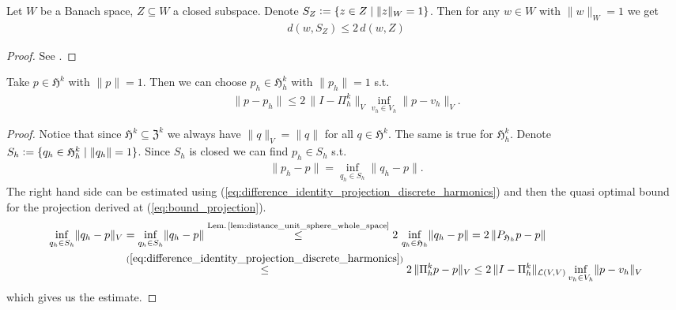 \documentclass[../master_thesis.tex]{subfiles}
\begin{document}
\begin{lemma}\label{lem:distance_unit_sphere_whole_space}
    Let $W$ be a Banach space, $Z \subseteq W$ a closed subspace. Denote 
    $S_Z \vcentcolon= \{ z \in Z \mid \lVert z \rVert _W = 1 \}$. Then for 
    any $w \in W$ with $\lVert w \rVert _W = 1$ we get 
    \begin{align*}
        d(w,S_Z) \leq 2 \,d(w,Z)
    \end{align*}  
\end{lemma}
\begin{proof}
    See \cite[Ch.4 §2, (2.13)]{kato_perturbation_theory}.
\end{proof}

\begin{proposition}\label{prop:choice_of_discrete_harmonic_form}
    Take $p \in \mathfrak{H}^k$ with $\lVert p \rVert = 1$. Then we can 
    choose $p_h \in \mathfrak{H}_h^k$ with $\lVert p_h \rVert = 1$ s.t. 
    \begin{align*}
        \lVert p - p_h \rVert
        \leq 2\,\lVert I - \Pi_h^k\rVert _V \inf_{v_h \in V_h} \lVert p - v_h \rVert _V.
    \end{align*}
\end{proposition}
\begin{proof}
    Notice that since $\mathfrak{H}^k \subseteq \mathfrak{Z}^k$ we always have
    $\lVert q \rVert _V = \lVert q \rVert$ for all $q \in \mathfrak{H}^k$. The same is 
    true for $\mathfrak{H}^k_h$.
    Denote $S_h \vcentcolon= \{ q_h \in \mathfrak{H}^k_h \mid \lVert q_h \rVert = 1 \}$.
    Since $S_h$ is closed we can find $p_h \in S_h$ s.t. 
    \begin{align*}
        \lVert p_h - p \rVert = \inf_{q_h \in S_h} \lVert q_h - p \rVert.
    \end{align*}
    The right hand side can be estimated using (\ref{eq:difference_identity_projection_discrete_harmonics}) 
    and then the 
    quasi optimal bound for the projection derived at (\ref{eq:bound_projection}).
    \begin{align*}
        \inf_{q_h \in S_h} \lVert q_h - p \rVert _V 
        &= \inf_{q_h \in S_h} \lVert q_h - p \rVert 
        \stackrel{\text{Lem.\,\ref{lem:distance_unit_sphere_whole_space}}}{\leq} 
            2\,\inf_{q_h \in \mathfrak{H}_h} \lVert q_h - p \rVert
        = 2\,\lVert P_{\mathfrak{H}_h}p - p \rVert
        \\ &\stackrel{(\ref{eq:difference_identity_projection_discrete_harmonics})}{\leq} 
            2\,\lVert \Pi_h^k p - p \rVert _V 
        \leq 2\,\lVert I - \Pi_h^k\rVert _{\mathcal{L}(V,V)}
            \inf_{v_h \in V_h} \lVert p - v_h \rVert _V
    \end{align*}
    which gives us the estimate.
\end{proof}
\end{document}
